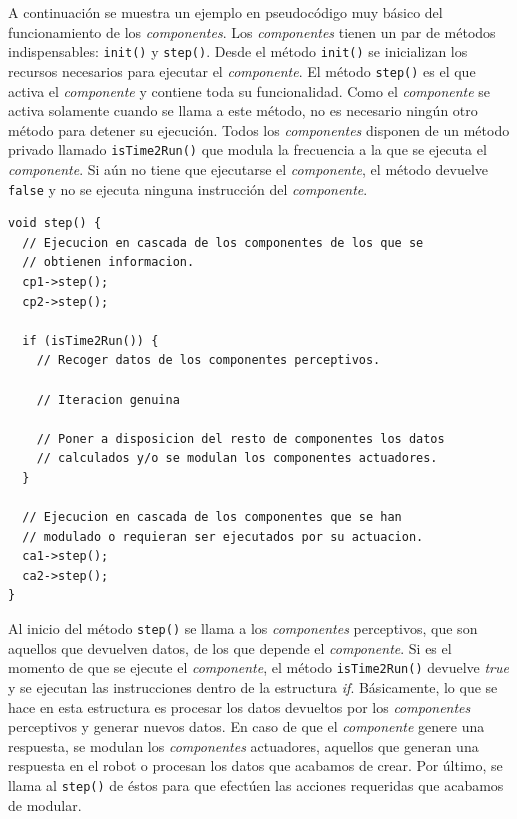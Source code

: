 A continuación se muestra un ejemplo en pseudocódigo muy básico del funcionamiento de los \textit{componentes}. Los \textit{componentes} tienen un par de métodos indispensables: \texttt{init()} y \texttt{step()}. Desde el método \texttt{init()} se inicializan los recursos necesarios para ejecutar el \textit{componente}. El método \texttt{step()} es el que activa el \textit{componente} y contiene toda su funcionalidad. Como el \textit{componente} se activa solamente cuando se llama a este método, no es necesario ningún otro método para detener su ejecución. Todos los \textit{componentes} disponen de un método privado llamado \texttt{isTime2Run()} que modula la frecuencia a la que se ejecuta el \textit{componente}. Si aún no tiene que ejecutarse el \textit{componente}, el método devuelve \texttt{false} y no se ejecuta ninguna instrucción del \textit{componente}.

\begin{lstlisting}[style=C]
void step() {
  // Ejecucion en cascada de los componentes de los que se
  // obtienen informacion.
  cp1->step();
  cp2->step();

  if (isTime2Run()) {
    // Recoger datos de los componentes perceptivos.

    // Iteracion genuina

    // Poner a disposicion del resto de componentes los datos
    // calculados y/o se modulan los componentes actuadores.
  }

  // Ejecucion en cascada de los componentes que se han
  // modulado o requieran ser ejecutados por su actuacion.
  ca1->step();
  ca2->step();
}
\end{lstlisting}

Al inicio del método \texttt{step()} se llama a los \textit{componentes} perceptivos, que son aquellos que devuelven datos, de los que depende el \textit{componente}. Si es el momento de que se ejecute el \textit{componente}, el método \texttt{isTime2Run()} devuelve \textit{true} y se ejecutan las instrucciones dentro de la estructura \textit{if}. Básicamente, lo que se hace en esta estructura es procesar los datos devueltos por los \textit{componentes} perceptivos y generar nuevos datos. En caso de que el \textit{componente} genere una respuesta, se modulan los \textit{componentes} actuadores, aquellos que generan una respuesta en el robot o procesan los datos que acabamos de crear. Por último, se llama al \texttt{step()} de éstos para que efectúen las acciones requeridas que acabamos de modular.\\

